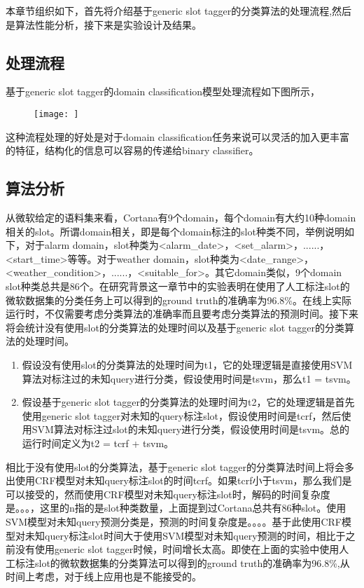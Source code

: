 \documentclass[master]{njuthesis}
\begin{document}
    本章节组织如下，首先将介绍基于generic slot tagger的分类算法的处理流程,然后是算法性能分析，接下来是实验设计及结果。

\subsection{处理流程}

    基于generic slot tagger的domain classification模型处理流程如下图所示，
    \begin{figure}[htbp]
      \centering
      \texttt{[image: ]}
      \caption{}\label{fig:test1}
    \end{figure}
    
    这种流程处理的好处是对于domain classification任务来说可以灵活的加入更丰富的特征，结构化的信息可以容易的传递给binary classifier。

\subsection{算法分析}

    从微软给定的语料集来看，Cortana有9个domain，每个domain有大约10种domain相关的slot。所谓domain相关，即是每个domain标注的slot种类不同，举例说明如下，对于alarm domain，slot种类为<alarm\_date>，<set\_alarm>，......，<start\_time>等等。对于weather domain，slot种类为<date\_range>，<weather\_condition>，......，<suitable\_for>。其它domain类似，9个domain slot种类总共是86个。在研究背景这一章节中的实验表明在使用了人工标注slot的微软数据集的分类任务上可以得到的ground truth的准确率为96.8\%。在线上实际运行时，不仅需要考虑分类算法的准确率而且要考虑分类算法的预测时间。接下来将会统计没有使用slot的分类算法的处理时间以及基于generic slot tagger的分类算法的处理时间。

\begin{enumerate}
 \item 假设没有使用slot的分类算法的处理时间为t1，它的处理逻辑是直接使用SVM算法对标注过的未知query进行分类，假设使用时间是tsvm，那么t1 = tsvm。
 \item 假设基于generic slot tagger的分类算法的处理时间为t2，它的处理逻辑是首先使用generic slot tagger对未知的query标注slot，假设使用时间是tcrf，然后使用SVM算法对标注过slot的未知query进行分类，假设使用时间是tsvm。总的运行时间定义为t2 = tcrf + tsvm。
\end{enumerate}

    相比于没有使用slot的分类算法，基于generic slot tagger的分类算法时间上将会多出使用CRF模型对未知query标注slot的时间tcrf。如果tcrf小于tsvm，那么我们是可以接受的，然而使用CRF模型对未知query标注slot时，解码的时间复杂度是。。。，这里的n指的是slot种类数量，上面提到过Cortana总共有86种slot。使用SVM模型对未知query预测分类是，预测的时间复杂度是。。。。基于此使用CRF模型对未知query标注slot时间大于使用SVM模型对未知query预测的时间，相比于之前没有使用generic slot tagger时候，时间增长太高。即使在上面的实验中使用人工标注slot的微软数据集的分类算法可以得到的ground truth的准确率为96.8\%,从时间上考虑，对于线上应用也是不能接受的。
\end{document}
